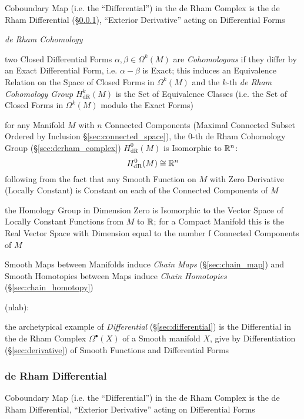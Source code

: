 Coboundary Map (i.e. the ``Differential'') in the de Rham Complex is the de Rham
Differential (\S\ref{sec:derham_differential}), ``Exterior Derivative'' acting
on Differential Forms

\emph{de Rham Cohomology}

two Closed Differential Forms $\alpha, \beta \in \Omega^k(M)$ are
\emph{Cohomologous} if they differ by an Exact Differential Form, i.e. $\alpha -
\beta$ is Exact; this induces an Equivalence Relation on the Space of Closed
Forms in $\Omega^k(M)$ and the $k$-th \emph{de Rham Cohomology Group}
$H_{\mathrm{dR}}^k(M)$ is the Set of Equivalence Classes (i.e. the Set of Closed
Forms in $\Omega^k(M)$ modulo the Exact Forms)

for any Manifold $M$ with $n$ Connected Components (Maximal Connected Subset
Ordered by Inclusion \S\ref{sec:connected_space}), the $0$-th de Rham Cohomology
Group (\S\ref{sec:derham_complex}) $H_{\mathrm{dR}}^0(M)$ is Isomorphic to
$\mathbb{R}^n$:
\[
  H_{\mathrm{dR}}^0(M) \cong \mathbb{R}^n
\]
following from the fact that any Smooth Function on $M$ with Zero Derivative
(Locally Constant) is Constant on each of the Connected Components of $M$

the Homology Group in Dimension Zero is Isomorphic to the Vector Space of
Locally Constant Functions from $M$ to $\mathbb{R}$; for a Compact Manifold this is
the Real Vector Space with Dimension equal to the number f Connected Components
of $M$

Smooth Maps between Manifolds induce \emph{Chain Maps} (\S\ref{sec:chain_map})
and Smooth Homotopies between Maps induce \emph{Chain Homotopies}
(\S\ref{sec:chain_homotopy})


(nlab):

the archetypical example of \emph{Differential} (\S\ref{sec:differential}) is
the Differential in the de Rham Complex $\Omega^\bullet(X)$ of a Smooth manifold
$X$, give by Differentiation (\S\ref{sec:derivative}) of Smooth Functions and
Differential Forms



\subsubsection{de Rham Differential}\label{sec:derham_differential}

Coboundary Map (i.e. the ``Differential'') in the de Rham Complex is the de Rham
Differential, ``Exterior Derivative'' acting on Differential Forms



